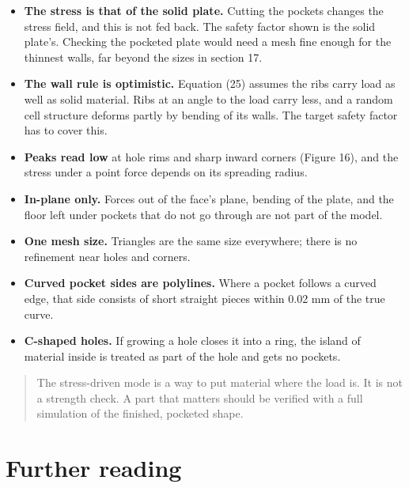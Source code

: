 \documentclass[11pt,a4paper]{article}
\begin{document}
\begin{itemize}
 
\item \textbf{The stress is that of the solid plate.} Cutting the pockets changes the stress field, and this is not fed back. The safety factor shown is the solid plate's. Checking the pocketed plate would need a mesh fine enough for the thinnest walls, far beyond the sizes in section 17. 
\item \textbf{The wall rule is optimistic.} Equation (25) assumes the ribs carry load as well as solid material. Ribs at an angle to the load carry less, and a random cell structure deforms partly by bending of its walls. The target safety factor has to cover this. 
\item \textbf{Peaks read low} at hole rims and sharp inward corners (Figure 16), and the stress under a point force depends on its spreading radius. 
\item \textbf{In-plane only.} Forces out of the face's plane, bending of the plate, and the floor left under pockets that do not go through are not part of the model. 
\item \textbf{One mesh size.} Triangles are the same size everywhere; there is no refinement near holes and corners. 
\item \textbf{Curved pocket sides are polylines.} Where a pocket follows a curved edge, that side consists of short straight pieces within 0.02 mm of the true curve. 
\item \textbf{C-shaped holes.} If growing a hole closes it into a ring, the island of material inside is treated as part of the hole and gets no pockets. 
\end{itemize}
 

\begin{quote}
The stress-driven mode is a way to put material where the load is. It is not a strength check. A part that matters should be verified with a full simulation of the finished, pocketed shape.
\end{quote}

\section*{Further reading}
\end{document}

